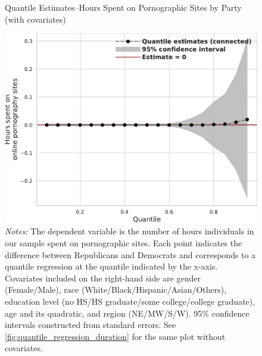 \documentclass[12pt, letterpaper]{article}
\begin{document}
\begin{figure}[ht]
	\centering
	\caption{Quantile Estimates--Hours Spent on Pornographic Sites by Party (with covariates)}
	\includegraphics[width=.55\linewidth]{figs/quantile_reg_covariates_duration_adult.pdf}
	\caption*{\footnotesize \emph{Notes:} 
		The dependent variable is the number of hours individuals in our sample spent on pornographic sites.
		Each point indicates the difference between Republicans and Democrats and corresponds to a quantile regression at the quantile indicated by the x-axis.
		Covariates included on the right-hand side are gender (Female/Male), race (White/Black/Hispanic/Asian/Others), education level (no HS/HS graduate/some college/college graduate), age and its quadratic, and region (NE/MW/S/W).
		95\% confidence intervals constructed from standard errors.
		See \cref{fig:quantile_regression_duration} for the same plot without covariates.
	}
	\label{fig:quantile_regression_duration_covariates}
\end{figure}
\end{document}

